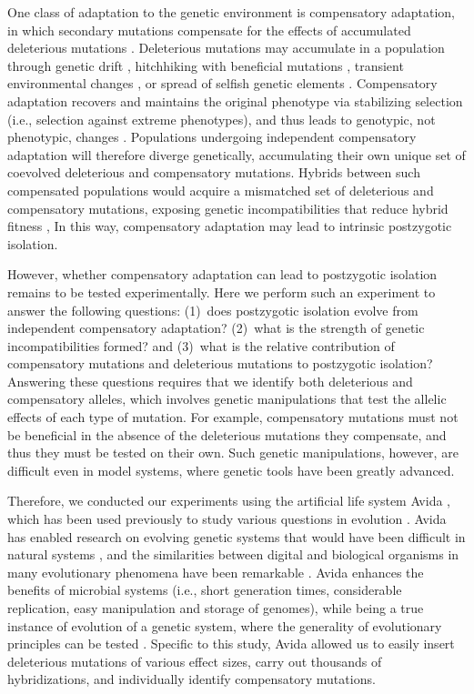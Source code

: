\documentclass[11pt]{article}
\begin{document}
One class of adaptation to the genetic environment
is compensatory adaptation, in which secondary mutations
compensate for the effects of accumulated deleterious mutations
\cite{har96,bur99,moo00,lev00,mai02,est03,est11}.
%
Deleterious mutations may accumulate in a population
through genetic drift \cite{lan94,lyn95},
hitchhiking with beneficial mutations \cite{chu11},
transient environmental changes \cite{bjo00},
or spread of selfish genetic elements \cite{pre10}.
%
Compensatory adaptation recovers and maintains the original phenotype
via stabilizing selection (i.e., selection against extreme phenotypes),
and thus leads to genotypic, not phenotypic, changes \cite{har96}.
%
Populations undergoing independent compensatory adaptation
will therefore diverge genetically, accumulating their own unique set
of coevolved deleterious and compensatory mutations.
%
Hybrids between such compensated populations would acquire
a mismatched set of deleterious and compensatory mutations,
exposing genetic incompatibilities that reduce hybrid fitness
\cite{har96,orr01,kon02,kul04,lan07,sch09b,pre10},
%
In this way, compensatory adaptation may lead to
intrinsic postzygotic isolation.



However, whether compensatory adaptation can lead to postzygotic isolation
remains to be tested experimentally.
%
Here we perform such an experiment to answer the following questions:
(1)~does postzygotic isolation evolve from independent compensatory adaptation?
(2)~what is the strength of genetic incompatibilities formed?
and (3)~what is the relative contribution of compensatory mutations
and deleterious mutations to postzygotic isolation?
%
Answering these questions requires that we identify
both deleterious and compensatory alleles,
which involves genetic manipulations that test the allelic
effects of each type of mutation.
%
For example, compensatory mutations must not be beneficial
in the absence of the deleterious mutations they compensate,
and thus they must be tested on their own.
%
Such genetic manipulations, however, are difficult even in
model systems, where genetic tools have been greatly advanced.



Therefore, we conducted our experiments using the artificial life system
Avida \cite{ofr04}, which has been used previously to study various questions
in evolution \cite{len99,len03,cho04,mis06,ele07,ele08,mis10}.
%
Avida has enabled research on evolving genetic systems
that would have been difficult in natural systems \cite{ada06},
and the similarities between digital and biological organisms
in many evolutionary phenomena have been remarkable \cite{wil02,ada06}.
%
Avida enhances the benefits of microbial systems
(i.e., short generation times, considerable replication,
easy manipulation and storage of genomes),
while being a true instance of evolution of a genetic system,
where the generality of evolutionary principles can be tested
\cite{len99,ele08,mis06}.
%
Specific to this study, Avida allowed us to easily insert deleterious mutations
of various effect sizes, carry out thousands of hybridizations,
and individually identify compensatory mutations.
\end{document}

